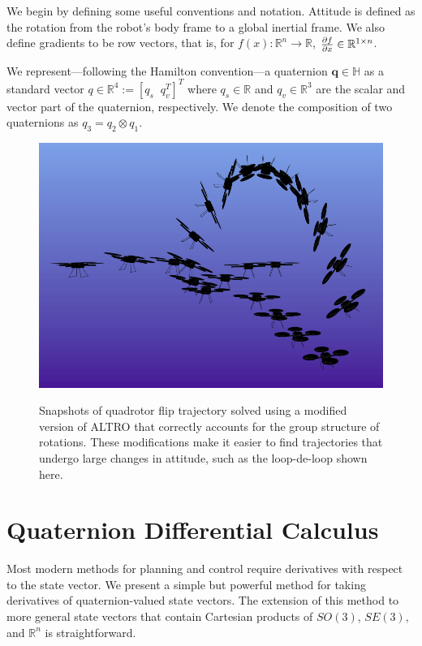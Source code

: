 \documentclass[letterpaper, 10 pt, conference]{ieeeconf}  %
\newcommand{\R}{\mathbb{R}}
\newcommand{\q}{\textbf{q}}
\begin{document}
    We begin by defining some useful conventions and notation. 
    Attitude is defined as the rotation from the robot's body frame to a global inertial 
        frame. 
    We also define gradients to be row vectors, that is, for 
        $f(x) : \R^n \to \R$, $\pdv{f}{x} \in \R^{1\times n}$.

    We represent---following the Hamilton convention---a quaternion $\q \in \mathbb{H}$ as 
    a standard vector $q \in \R^4 := [q_s \;\; q_v^T]^T$ where $q_s \in \R$ and 
    $q_v \in \R^3$ are the scalar and vector part of the quaternion, respectively. We denote
    the composition of two quaternions as $q_3 = q_2 \otimes q_1$.
        
    \begin{figure}
        \centering
        \includegraphics[width=\columnwidth]{figures/quadflip_new.png}
        \label{fig:quadflip}
        \caption{Snapshots of quadrotor flip trajectory solved using a modified version of 
        ALTRO that correctly accounts for the group structure of rotations. These modifications
        make it easier to find trajectories that undergo large changes in attitude, such as
        the loop-de-loop shown here.}
    \end{figure}

\section{Quaternion Differential Calculus} \label{sec:Quaternion_Calculus}
    Most modern methods for planning and control require derivatives with respect to the
    state vector. We present a simple but powerful method for taking derivatives of 
    quaternion-valued state vectors. The extension of this method to more general state vectors that contain Cartesian products of $SO(3)$, $SE(3)$, and $\mathbb{R}^n$ is straightforward.
\end{document}
